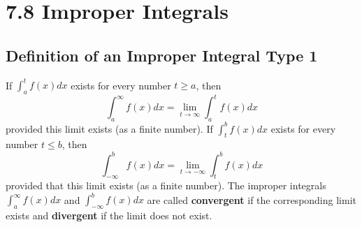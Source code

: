 %
%

\section*{7.8 Improper Integrals}

\subsection*{Definition of an Improper Integral Type 1}

If \(\int_a^t f(x)dx \) exists for every number \(t \geq a\), then
\[\int_a^{\infty}f(x) dx = \lim_{t \to \infty}\int_a^t f(x)dx \]
provided this limit exists (as a finite number).
\newline
\noindent
If \(\int_t^b f(x)dx\) exists for every number \(t \leq b\), then
\[ \int_{-\infty}^b f(x)dx = \lim_{t \to -\infty} \int_t^b f(x) dx \]
provided that this limit exists (as a finite number).
\newline
\noindent
The improper integrals \( \int_a^{\infty} f(x)dx \) and \( \int_{-\infty}^b f(x)dx \) are called \textbf{convergent} if the corresponding limit exists and \textbf{divergent} if the limit does not exist.
